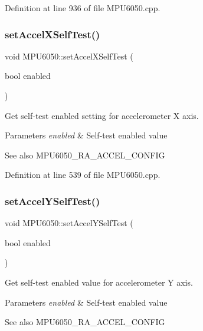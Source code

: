 Definition at line 936 of file M\+P\+U6050.\+cpp.

\mbox{\label{classMPU6050_ac2ab843dc9d241056ed0f891195cdbf9}} 
\subsubsection{\texorpdfstring{setAccelXSelfTest()}{setAccelXSelfTest()}}
{\footnotesize\ttfamily void M\+P\+U6050\+::set\+Accel\+X\+Self\+Test (\begin{DoxyParamCaption}\item[{bool}]{enabled }\end{DoxyParamCaption})}



Get self-\/test enabled setting for accelerometer X axis. 


\begin{DoxyParams}{Parameters}
{\em enabled} & Self-\/test enabled value \\
\hline
\end{DoxyParams}
\begin{DoxySeeAlso}{See also}
M\+P\+U6050\+\_\+\+R\+A\+\_\+\+A\+C\+C\+E\+L\+\_\+\+C\+O\+N\+F\+IG 
\end{DoxySeeAlso}


Definition at line 539 of file M\+P\+U6050.\+cpp.

\mbox{\label{classMPU6050_ad5847430ab297959e4d0e9b81ba2e3ba}} 
\subsubsection{\texorpdfstring{setAccelYSelfTest()}{setAccelYSelfTest()}}
{\footnotesize\ttfamily void M\+P\+U6050\+::set\+Accel\+Y\+Self\+Test (\begin{DoxyParamCaption}\item[{bool}]{enabled }\end{DoxyParamCaption})}



Get self-\/test enabled value for accelerometer Y axis. 


\begin{DoxyParams}{Parameters}
{\em enabled} & Self-\/test enabled value \\
\hline
\end{DoxyParams}
\begin{DoxySeeAlso}{See also}
M\+P\+U6050\+\_\+\+R\+A\+\_\+\+A\+C\+C\+E\+L\+\_\+\+C\+O\+N\+F\+IG 
\end{DoxySeeAlso}



